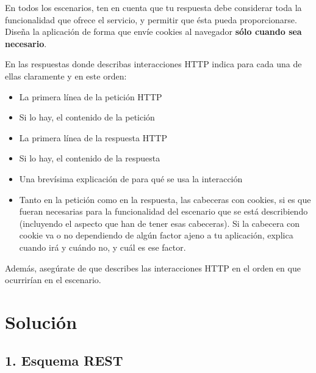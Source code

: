 En todos los escenarios, ten en cuenta que tu respuesta debe considerar toda la funcionalidad que ofrece el servicio, y permitir que ésta pueda proporcionarse. Diseña la aplicación de forma que envíe cookies al navegador {\bf sólo cuando sea necesario}.

En las respuestas donde describas interacciones HTTP indica para cada una de ellas claramente y en este orden:
    \begin{itemize}
    \item La primera línea de la petición HTTP
    \item Si lo hay, el contenido de la petición
    \item La primera línea de la respuesta HTTP
    \item Si lo hay, el contenido de la respuesta
    \item Una brevísima explicación de para qué se usa la interacción
    \item Tanto en la petición como en la respuesta, las cabeceras con cookies, si es que fueran necesarias para la funcionalidad del escenario que se está describiendo (incluyendo el aspecto que han de tener esas cabeceras). Si la cabecera con cookie va o no dependiendo de algún factor ajeno a tu aplicación, explica cuando irá y cuándo no, y cuál es ese factor.
    \end{itemize}

Además, asegúrate de que describes las interacciones HTTP en el orden en que ocurrirían en el escenario.

\section*{Solución}

\subsection*{1. Esquema REST}

